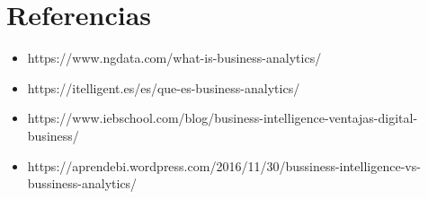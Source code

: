 \section{Referencias} 
\begin{itemize}
\item https://www.ngdata.com/what-is-business-analytics/ 
\item https://itelligent.es/es/que-es-business-analytics/
\item https://www.iebschool.com/blog/business-intelligence-ventajas-digital-business/
\item https://aprendebi.wordpress.com/2016/11/30/bussiness-intelligence-vs-bussiness-analytics/
\end{itemize}